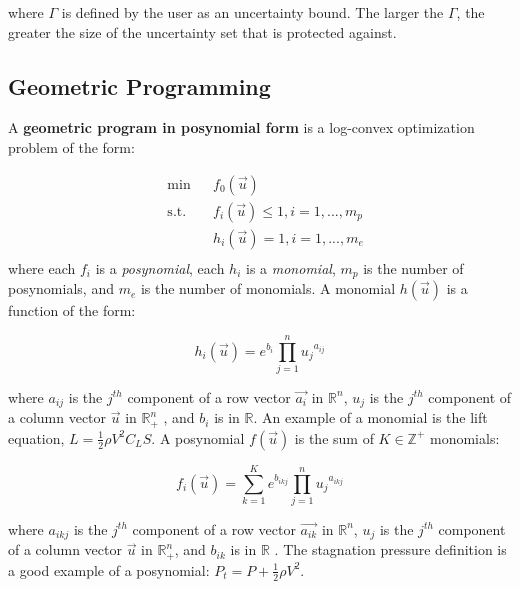 where $\Gamma$ is defined by the user as an uncertainty bound. The larger the $\Gamma$,
the greater the size of the uncertainty set that is protected against.

\subsection{Geometric Programming}

A \textbf{geometric program in posynomial form} is a log-convex optimization problem of the form:

\begin{equation}
\begin{aligned}
	& \text{min} && f_0 \left(\vec{u}\right) \\
	& \text{s.t.} && f_i \left(\vec{u}\right) \leq 1, i = 1,...,m_p\\
	& && h_i \left(\vec{u}\right) = 1, i = 1, ...,m_e\\
\end{aligned}
\label{GP_standard}
\end{equation}
where each $f_i$ is a {\em posynomial}, each $h_i$ is a {\em monomial}, $m_p$ is the number of posynomials,
and $m_e$ is the number of monomials. A monomial $h(\vec{u})$ is a function of the form:

\begin{displaymath}
	h_i(\vec{u}) = e^{b_i}\textstyle{\prod}_{j=1}^{n}{u_j}^{a_{ij}}
\end{displaymath}

where $a_{ij}$ is the $j^{th}$ component of a row vector $\vec{a_i}$ in $\mathbb{R}^n$,
$u_j$ is the $j^{th}$ component of a column vector $\vec{u}$ in $\mathbb{R}^n_+$ ,
and $b_i$ is in $\mathbb{R}$. An example of a monomial is the lift equation,
$L = \frac{1}{2}\rho V^2 C_L S$.
A posynomial $f(\vec{u})$ is the sum of $K \in \mathbb{Z}^+$ monomials:

\begin{displaymath}
	f_i(\vec{u}) = \textstyle{\sum_{k=1}^{K}}e^{b_{ikj}}\prod_{j=1}^{n}{u_j}^{a_{ikj}}
\end{displaymath}

where $a_{ikj}$ is the $j^{th}$ component of a row vector $\vec{a_{ik}}$ in $\mathbb{R}^n$,
$u_j$ is the $j^{th}$ component of a column vector $\vec{u}$ in $\mathbb{R}^n_+$, and $b_{ik}$
is in $\mathbb{R}$ \cite{Boyd2007}. The stagnation pressure definition is a good example of a posynomial:
$P_t = P + \frac{1}{2} \rho V^2$.\\

